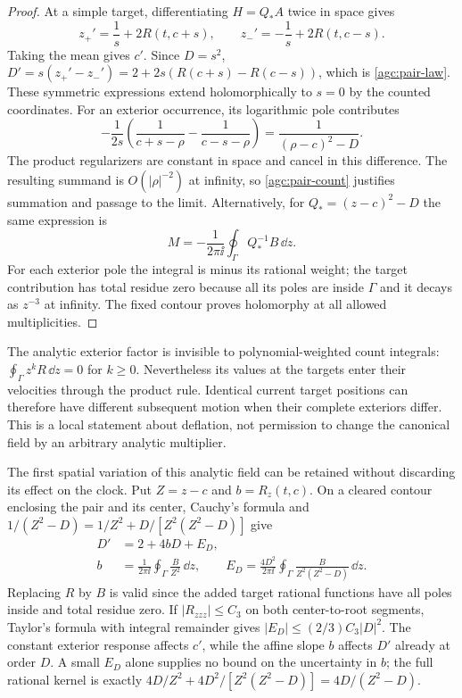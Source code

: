 \begin{proof}
At a simple target, differentiating $H=Q_*A$ twice in space gives
\[
 z_+'=\frac1s+2R(t,c+s),\qquad
 z_-'=-\frac1s+2R(t,c-s).
\]
Taking the mean gives $c'$. Since $D=s^2$,
$D'=s(z_+'-z_-')=2+2s(R(c+s)-R(c-s))$, which is
\eqref{agc:pair-law}. These symmetric expressions extend holomorphically
to $s=0$ by the counted coordinates.
For an exterior occurrence, its logarithmic pole contributes
\[
 -\frac1{2s}\left(\frac1{c+s-\rho}-\frac1{c-s-\rho}\right)
       =\frac1{(\rho-c)^2-D}.
\]
The product regularizers are constant in space and cancel in this
difference. The resulting summand is $O(|\rho|^{-2})$ at infinity,
so \eqref{agc:pair-count} justifies summation and passage to the limit.
Alternatively, for $Q_*=(z-c)^2-D$ the same expression is
\begin{equation}
 M=-\frac1{2\pi\ii}\oint_\Gamma Q_*^{-1}B\,\dd z.
 \label{agc:pair-M-contour}
\end{equation}
For each exterior pole the integral is minus its rational weight;
the target contribution has total residue zero because all its poles
are inside $\Gamma$ and it decays as $z^{-3}$ at infinity.
The fixed contour proves holomorphy at all allowed multiplicities.
\end{proof}

The analytic exterior factor is invisible to polynomial-weighted count
integrals: $\oint_\Gamma z^kR\,\dd z=0$ for $k\ge0$.
Nevertheless its values at the targets enter their velocities through
the product rule. Identical current target positions can therefore have
different subsequent motion when their complete exteriors differ.
This is a local statement about deflation, not permission to change
the canonical field by an arbitrary analytic multiplier.

The first spatial variation of this analytic field can be retained
without discarding its effect on the clock. Put $Z=z-c$ and
$b=R_z(t,c)$. On a cleared contour enclosing the pair and its center,
Cauchy's formula and
$1/(Z^2-D)=1/Z^2+D/[Z^2(Z^2-D)]$ give
\begin{equation}
 \begin{split}
 D'&=2+4bD+E_D,\\
 b&=\frac1{2\pi\ii}\oint_\Gamma\frac{B}{Z^2}\,\dd z,\qquad
 E_D=\frac{4D^2}{2\pi\ii}\oint_\Gamma
                         \frac{B}{Z^2(Z^2-D)}\,\dd z.
 \end{split}
 \label{agc:pair-affine}
\end{equation}
Replacing $R$ by $B$ is valid since the added target rational functions
have all poles inside and total residue zero. If $|R_{zzz}|\le C_3$
on both center-to-root segments, Taylor's formula with integral
remainder gives $|E_D|\le(2/3)C_3|D|^2$.
The constant exterior response affects $c'$, while the affine slope
$b$ affects $D'$ already at order $D$. A small $E_D$ alone supplies
no bound on the uncertainty in $b$; the full rational kernel is exactly
$4D/Z^2+4D^2/[Z^2(Z^2-D)]=4D/(Z^2-D)$.

